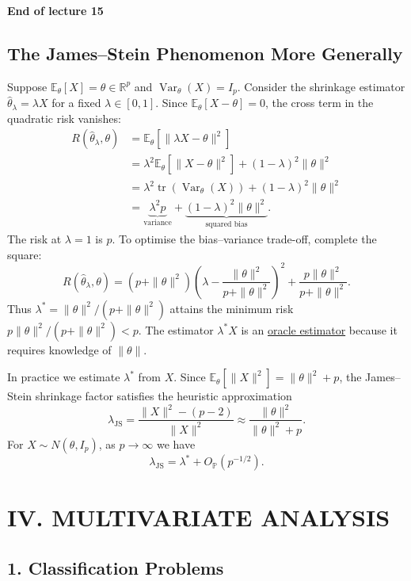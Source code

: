 \documentclass[11pt,a4paper]{article}
\begin{document}
\begin{center}
\textbf{End of lecture 15}
\end{center}

\subsection*{The James--Stein Phenomenon More Generally}

Suppose $\mathbb E_\theta[X]=\theta\in\mathbb R^p$ and
$\operatorname{Var}_\theta(X)=I_p$. Consider the shrinkage estimator
$\hat\theta_\lambda=\lambda X$ for a fixed $\lambda\in[0,1]$.
Since $\mathbb E_\theta[X-\theta]=0$, the cross term in the quadratic
risk vanishes:
\[
\begin{aligned}
R(\hat\theta_\lambda,\theta)
&=\mathbb E_\theta[\|\lambda X-\theta\|^2]\\
&=\lambda^2\mathbb E_\theta[\|X-\theta\|^2]+(1-\lambda)^2\|\theta\|^2\\
&=\lambda^2\operatorname{tr}(\operatorname{Var}_\theta(X))
  +(1-\lambda)^2\|\theta\|^2\\
&=\underbrace{\lambda^2p}_{\text{variance}}
  +\underbrace{(1-\lambda)^2\|\theta\|^2}_{\text{squared bias}}.
\end{aligned}
\]
The risk at $\lambda=1$ is $p$. To optimise the bias--variance
trade-off, complete the square:
\[
R(\hat\theta_\lambda,\theta)
=(p+\|\theta\|^2)
\left(\lambda-\frac{\|\theta\|^2}{p+\|\theta\|^2}\right)^2
+\frac{p\|\theta\|^2}{p+\|\theta\|^2}.
\]
Thus $\lambda^*=\|\theta\|^2/(p+\|\theta\|^2)$ attains the minimum risk
$p\|\theta\|^2/(p+\|\theta\|^2)<p$. The estimator $\lambda^*X$ is an
\underline{oracle estimator} because it requires knowledge of $\|\theta\|$.

In practice we estimate $\lambda^*$ from $X$. Since
$\mathbb E_\theta[\|X\|^2]=\|\theta\|^2+p$, the James--Stein shrinkage
factor satisfies the heuristic approximation
\[
\lambda_{\mathrm{JS}}
=\frac{\|X\|^2-(p-2)}{\|X\|^2}
\approx\frac{\|\theta\|^2}{\|\theta\|^2+p}.
\]
For $X\sim N(\theta,I_p)$, as $p\to\infty$ we have
\[
\lambda_{\mathrm{JS}}=\lambda^*+O_{\mathbb P}(p^{-1/2}).
\]

\section*{IV. MULTIVARIATE ANALYSIS}

\subsection*{1. Classification Problems}
\end{document}
